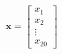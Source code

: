 \documentclass[preview]{standalone}
\begin{document}
\begin{align*}
\mathbf{x} = \begin{bmatrix} x_1 \\ x_2 \\ \vdots \\ x_{20} \end{bmatrix}
\end{align*}
\end{document}
